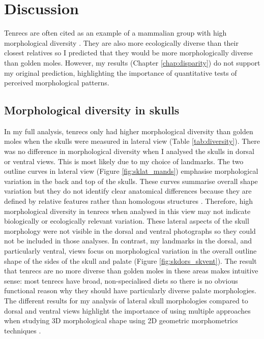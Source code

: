\chapter{Discussion}
\label{chap:discussion}

\noindent

	Tenrecs are often cited as an example of a mammalian group with high morphological diversity \citep{Olson2013, Soarimalala2011, Eisenberg1969}. They are also more ecologically diverse than their closest relatives \citep{Soarimalala2011, Bronner1995} so I predicted that they would be more morphologically diverse than golden moles. However, my results (Chapter \ref{chap:disparity}) do not support my original prediction, highlighting the importance of quantitative tests of perceived morphological patterns.

\section{Morphological diversity in skulls}


	In my full analysis, tenrecs only had higher morphological diversity than golden moles when the skulls were measured in lateral view (Table \ref{tab:diversity}). There was no difference in morphological diversity when I analysed the skulls in dorsal or ventral views. This is most likely due to my choice of landmarks. The two outline curves in lateral view (Figure \ref{fig:sklat_mands}) emphasise morphological variation in the back and top of the skulls. These curves summarise overall shape variation but they do not identify clear anatomical differences because they are defined by relative features rather than homologous structures \citep{Zelditch2012}. Therefore, high morphological diversity in tenrecs when analysed in this view may not indicate biologically or ecologically relevant variation.	
	These lateral aspects of the skull morphology were not visible in the dorsal and ventral photographs so they could not be included in those analyses. In contrast, my landmarks in the dorsal, and particularly ventral, views focus on morphological variation in the overall outline shape of the sides of the skull and palate (Figure \ref{fig:skdors_skvent}). The result that tenrecs are no more diverse than golden moles in these areas makes intuitive sense: most tenrecs have broad, non-specialised diets \citep{Olson2013} so there is no obvious functional reason why they should have particularly diverse palate morphologies.
	The different results for my analysis of lateral skull morphologies compared to dorsal and ventral views highlight the importance of using multiple approaches when studying 3D morphological shape using 2D geometric morphometrics techniques \citep{Arnqvist1998}.

